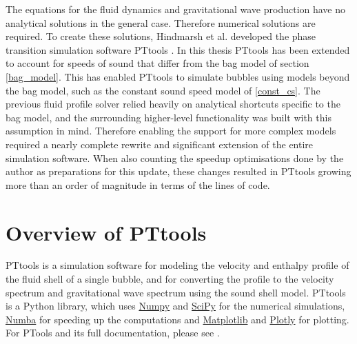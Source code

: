 The equations for the fluid dynamics and gravitational wave production have no analytical solutions in the general case.
Therefore numerical solutions are required.
To create these solutions, Hindmarsh et al. developed the phase transition simulation software PTtools \cite{pttools}.
In this thesis PTtools has been extended to account for speeds of sound that differ from the bag model of section \ref{bag_model}.
This has enabled PTtools to simulate bubbles using models beyond the bag model,
such as the constant sound speed model of \ref{const_cs}.
The previous fluid profile solver relied heavily on analytical shortcuts specific to the bag model,
and the surrounding higher-level functionality was built with this assumption in mind.
Therefore enabling the support for more complex models required a nearly complete rewrite and significant extension of the entire simulation software.
When also counting the speedup optimisations done by the author as preparations for this update,
these changes resulted in PTtools growing more than an order of magnitude in terms of the lines of code.


\section{Overview of PTtools}
PTtools \cite{pttools} is a simulation software for modeling the velocity and enthalpy profile of the fluid shell of a single bubble,
and for converting the profile to the velocity spectrum and gravitational wave spectrum using the sound shell model.
PTtools is a Python library, which uses
\href{https://numpy.org/}{Numpy}
and
\href{https://scipy.org/}{SciPy}
for the numerical simulations,
\href{https://numba.pydata.org/}{Numba}
for speeding up the computations and
\href{https://matplotlib.org/}{Matplotlib}
and
\href{https://plotly.com/}{Plotly}
for plotting.
For PTools and its full documentation, please see \cite{pttools}.


